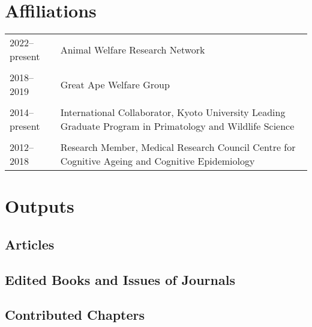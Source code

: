 \documentclass[11pt]{article}
\begin{document}
\section*{Affiliations}

\begin{tabular}{p{3cm}p{12cm}}
2022--present & Animal Welfare Research Network \\ \\

2018--2019 & Great Ape Welfare Group \\ \\

2014--present & International Collaborator, Kyoto University Leading Graduate Program in
Primatology and Wildlife Science \\ \\

2012--2018 & Research Member, Medical Research Council Centre for
Cognitive Ageing and Cognitive Epidemiology
\end{tabular}

\newpage

\section*{Outputs}
\subsection*{Articles}

\nocite{*}

\setlength\bibhang{0pt}

\printbibliography[type=article,notkeyword=reviewrevision,heading=none]

\subsection*{Edited Books and Issues of Journals}

\printbibliography[keyword=editor,notkeyword=reviewrevision,heading=none]

\subsection*{Contributed Chapters}

\printbibliography[type=inbook,notkeyword=reviewrevision,heading=none]

\end{document}
